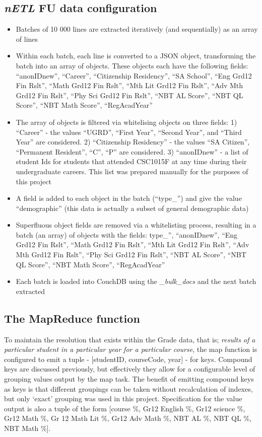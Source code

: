\subsection*{\textit{nETL} FU data configuration}
\begin{itemize}
    \item Batches of 10 000 lines are extracted iteratively (and sequentially) as an array of lines
    \item Within each batch, each line is converted to a JSON object, transforming the batch into an array of objects. These objects each have the following fields: ``anonIDnew'', ``Career'', ``Citizenship Residency'', ``SA School'', ``Eng Grd12 Fin Rslt'', ``Math Grd12 Fin Rslt'', ``Mth Lit Grd12 Fin Rslt'', ``Adv Mth Grd12 Fin Rslt'', ``Phy Sci Grd12 Fin Rslt'', ``NBT AL Score'', ``NBT QL Score'', ``NBT Math Score'', ``RegAcadYear''
    \item The array of objects is filtered via whitelising objects on three fields: 1) ``Career'' - the values ``UGRD'', ``First Year'', ``Second Year'', and ``Third Year'' are considered. 2) ``Citizenship Residency'' - the values ``SA Citizen'', ``Permanent Resident'', ``C'', ``P'' are considered. 3) ``anonIDnew'' - a list of student Ids for students that attended CSC1015F at any time during their undergraduate careers. This list was prepared manually for the purposes of this project
    \item A field is added to each object in the batch (``type\_'') and give the value ``demographic'' (this data is actually a subset of general demographic data)
    \item Superfluous object fields are removed via a whitelisting process, resulting in a batch (an array) of objects with the fields: type\_'', ``anonIDnew'', ``Eng Grd12 Fin Rslt'', ``Math Grd12 Fin Rslt'', ``Mth Lit Grd12 Fin Rslt'', ``Adv Mth Grd12 Fin Rslt'', ``Phy Sci Grd12 Fin Rslt'', ``NBT AL Score'', ``NBT QL Score'', ``NBT Math Score'', ``RegAcadYear''
    \item Each batch is loaded into CouchDB using the \textit{\_bulk\_docs} and the next batch extracted
\end{itemize}

\subsection*{The MapReduce function}
To maintain the resolution that exists within the Grade data, that is; \textit{results of a particular student in a particular year for a particular course}, the map function is configured to emit a tuple - [studentID, courseCode, year] - for keys. Compound keys are discussed previously, but effectively they allow for a configurable level of grouping values output by the map task. The benefit of emitting compound keys as keys is that different groupings can be taken without recalculation of indexes, but only `exact' grouping was used in this project. Specification for the value output is also a tuple of the form [course \%, Gr12 English \%, Gr12 science \%, Gr12 Math \%, Gr 12 Math Lit \%, Gr12 Adv Math \%, NBT AL \%, NBT QL \%, NBT Math \%].

